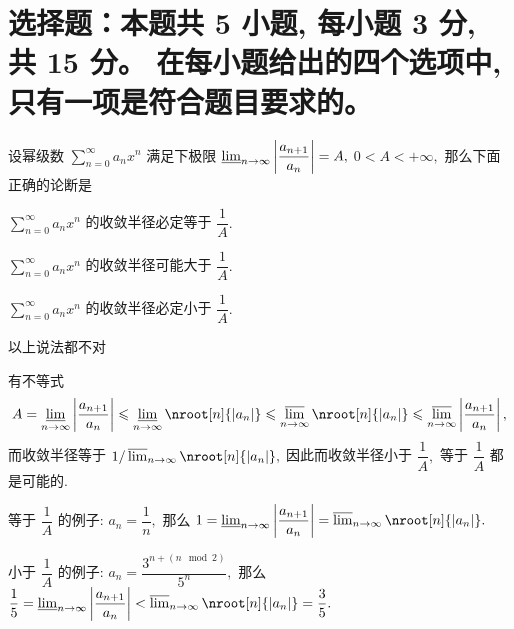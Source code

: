 


\makeexamtitle


\section{%
  选择题：本题共 5 小题, 每小题 3 分, 共 15 分。
  在每小题给出的四个选项中, 只有一项是符合题目要求的。
}


\begin{question}
设幂级数 $\sum\limits_{n=0}^\infty a_n x^n$ 满足下极限 $\varliminf_{n\to\infty} \left\lvert \dfrac{a_{n+1}}{a_n} \right\rvert = A,$ $0 < A < +\infty,$ 那么下面正确的论断是 \paren[D]

\begin{choices}
\item $\sum\limits_{n=0}^\infty a_n x^n$ 的收敛半径必定等于 $\dfrac{1}{A}.$
\item $\sum\limits_{n=0}^\infty a_n x^n$ 的收敛半径可能大于 $\dfrac{1}{A}.$
\item $\sum\limits_{n=0}^\infty a_n x^n$ 的收敛半径必定小于 $\dfrac{1}{A}.$
\item 以上说法都不对
\end{choices}
\end{question}

\begin{solution}
有不等式
\[A = \varliminf_{n\to\infty} \left\lvert \dfrac{a_{n+1}}{a_n} \right\rvert \leqslant \varliminf_{n\to\infty} \nroot[n]{\lvert a_n \rvert} \leqslant \varlimsup_{n\to\infty} \nroot[n]{\lvert a_n \rvert} \leqslant \varlimsup_{n\to\infty}  \left\lvert \dfrac{a_{n+1}}{a_n} \right\rvert,\]
而收敛半径等于 $1 / \varlimsup_{n\to\infty} \nroot[n]{\lvert a_n \rvert},$ 因此而收敛半径小于 $\dfrac{1}{A},$ 等于 $\dfrac{1}{A}$ 都是可能的.

等于 $\dfrac{1}{A}$ 的例子: $a_n = \dfrac{1}{n},$ 那么 $1 = \varliminf_{n\to\infty} \left\lvert \dfrac{a_{n+1}}{a_n} \right\rvert = \varlimsup_{n\to\infty} \nroot[n]{\lvert a_n \rvert}.$

小于 $\dfrac{1}{A}$ 的例子: $a_n = \dfrac{3^{n + (n \mod 2)}}{5^n},$ 那么 $\dfrac{1}{5} = \varliminf_{n\to\infty} \left\lvert \dfrac{a_{n+1}}{a_n} \right\rvert < \varlimsup_{n\to\infty} \nroot[n]{\lvert a_n \rvert} = \dfrac{3}{5}.$
\end{solution}

